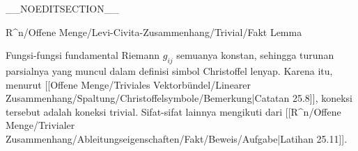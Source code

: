 __NOEDITSECTION__

{R^n/Offene Menge/Levi-Civita-Zusammenhang/Trivial/Fakt}
{Lemma}
{}
{

\faktzusatz {}
\faktzusatz {}

}
{

Fungsi-fungsi fundamental Riemann $g_{ij}$ semuanya konstan, sehingga turunan parsialnya yang muncul dalam definisi simbol Christoffel lenyap. Karena itu, menurut
[[Offene Menge/Triviales Vektorbündel/Linearer Zusammenhang/Spaltung/Christoffelsymbole/Bemerkung|Catatan 25.8]],
koneksi tersebut adalah koneksi trivial. Sifat-sifat lainnya mengikuti dari
[[R^n/Offene Menge/Trivialer Zusammenhang/Ableitungseigenschaften/Fakt/Beweis/Aufgabe|Latihan 25.11]].

}

